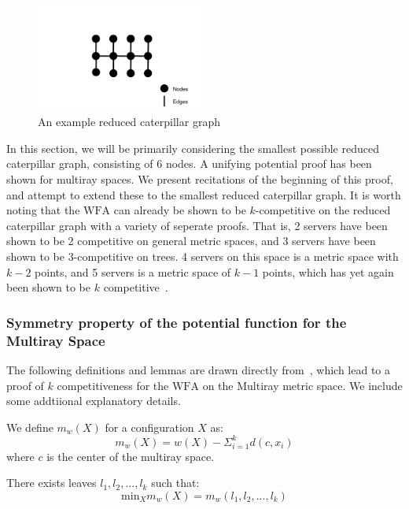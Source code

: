 \begin{figure}[H]
    \centering
    \includegraphics[width=0.5\textwidth]{images/reducedCaterpillar.png}
    \caption{An example reduced caterpillar graph}
\end{figure}

In this section, we will be primarily considering the smallest possible reduced caterpillar graph, consisting of 6 nodes. A unifying potential proof has been shown for multiray spaces. We present recitations of the beginning of this proof, and attempt to extend these to the smallest reduced caterpillar graph. It is worth noting that the $\mathrm{WFA}$ can already be shown to be $k$-competitive on the reduced caterpillar graph with a variety of seperate proofs. That is, 2 servers have been shown to be 2 competitive on general metric spaces, and 3 servers have been shown to be $3$-competitive on trees. 4 servers on this space is a metric space with $k-2$ points, and 5 servers is a metric space of $k-1$ points, which has yet again been shown to be $k$ competitive~\cite{unifyingPotential2021}.

\subsubsection*{Symmetry property of the potential function for the Multiray Space}

The following definitions and lemmas are drawn directly from~\cite{unifyingPotential2021}, which lead to a proof of $k$ competitiveness for the $\mathrm{WFA}$ on the Multiray metric space. We include some addtiional explanatory details.

\begin{definition}
    \label{def:mw}
    We define $m_w(X)$ for a configuration $X$ as:
    \begin{equation*}
        m_w(X) = w(X) - \Sigma_{i=1} ^ k d(c, x_i)
    \end{equation*}
    where $c$ is the center of the multiray space.
\end{definition}

\begin{lemma}
    \label{lem:leaf2}
    There exists leaves $l_1, l_2, ..., l_k$ such that: 
    \begin{equation*}
        \mathrm{min}_X m_w(X) = m_w (l_1, l_2, ..., l_k)
    \end{equation*}
\end{lemma}

